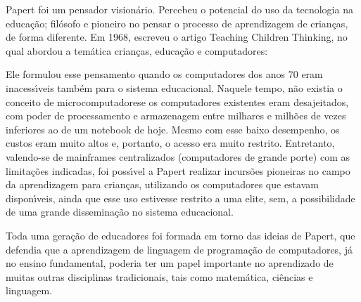 \documentclass[
12pt,		%
openright,	%
twoside,  %
a4paper,			%
chapter=TITLE,		%
english,			%
french,				%
spanish,			%
brazil				%
]{USPSC-classe/USPSC}
\begin{document}
Papert foi um pensador vision\'ario. Percebeu o potencial do uso da tecnologia na educa\c{c}\~ao; fil\'osofo e pioneiro no pensar o processo de aprendizagem de crian\c{c}as, de forma diferente. Em 1968, escreveu o artigo \textquotedbl Teaching Children Thinking\textquotedbl , no qual abordou a tem\'atica crian\c{c}as, educa\c{c}\~ao e computadores:















\noindent\begin{center}\mbox{\centering{}}\end{center}


Ele formulou esse pensamento quando os computadores dos anos 70 eram inacess\'{\i}veis tamb\'em para o sistema educacional. Naquele tempo, n\~ao existia o conceito de \textquotedbl microcomputadores\textquotedbl  e os computadores existentes eram desajeitados, com poder de processamento e armazenagem entre milhares e milh\~oes de vezes inferiores ao de um notebook de hoje. Mesmo com esse baixo desempenho, os custos eram muito altos e, portanto, o acesso era muito restrito. Entretanto, valendo-se de mainframes centralizados (computadores de grande porte) com as limita\c{c}\~oes indicadas, foi poss\'{\i}vel a Papert realizar incurs\~oes pioneiras no campo da aprendizagem para crian\c{c}as, utilizando os computadores que estavam dispon\'{\i}veis, ainda que esse uso estivesse restrito a uma elite, sem, a possibilidade de uma grande dissemina\c{c}\~ao no sistema educacional.














Toda uma gera\c{c}\~ao de educadores foi formada em torno das ideias de Papert, que defendia que a aprendizagem de linguagem de programa\c{c}\~ao de computadores, j\'a no ensino fundamental, poderia ter um papel importante no aprendizado de muitas outras disciplinas tradicionais, tais como matem\'atica, ci\^encias e linguagem.
\end{document}
